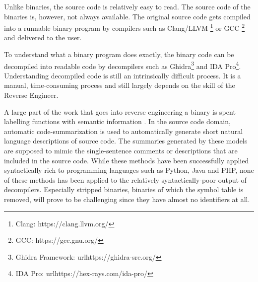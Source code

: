 Unlike binaries, the source code is relatively easy to read. The source code of the binaries is, however, not always available. The original source code gets compiled into a runnable binary program by compilers such as Clang/LLVM \footnote{Clang: https://clang.llvm.org/} or GCC \footnote{GCC: https://gcc.gnu.org/} and delivered to the user.

To understand what a binary program does exactly, the binary code can be decompiled into readable code by decompilers such as Ghidra\footnote{Ghidra Framework: url{https://ghidra-sre.org/}} and IDA Pro\footnote{IDA Pro: url{https://hex-rays.com/ida-pro/}}. Understanding decompiled code is still an intrinsically difficult process. It is a manual, time-consuming process and still largely depends on the skill of the Reverse Engineer\cite{TypeInferenceSurvey}.

A large part of the work that goes into reverse engineering a binary is spent labelling functions with semantic information \cite{reverseEngineerProcess}. In the source code domain, automatic code-summarization  \cite{recommend_summarization} is used to automatically generate short natural language descriptions of source code. The summaries generated by these models are supposed to mimic the single-sentence comments or descriptions that are included in the source code. While these methods have been successfully applied syntactically rich to programming languages such as Python, Java and PHP\cite{CodeT5, CodeBERT, CodeX}, none of these methods has been applied to the relatively syntactically-poor output of decompilers. Especially stripped binaries, binaries of which the symbol table is removed, will prove to be challenging since they have almost no identifiers at all.

